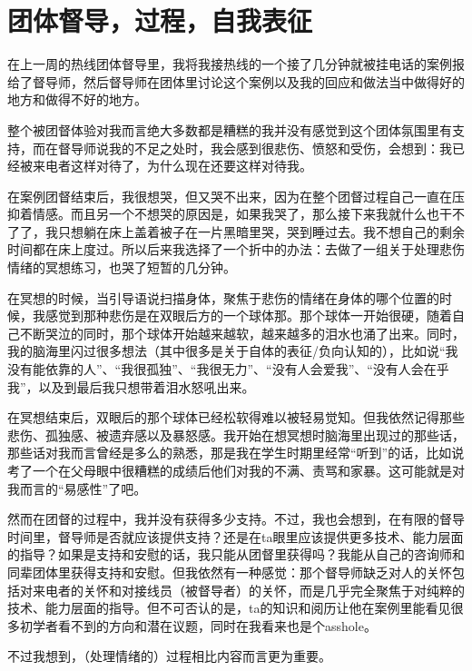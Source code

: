 \chapter{团体督导，过程，自我表征}




在上一周的热线团体督导里，我将我接热线的一个接了几分钟就被挂电话的案例报给了督导师，然后督导师在团体里讨论这个案例以及我的回应和做法当中做得好的地方和做得不好的地方。

整个被团督体验对我而言绝大多数都是糟糕的\pozhehao{}我并没有感觉到这个团体氛围里有支持，而在督导师说我的不足之处时，我会感到很悲伤、愤怒和受伤，会想到：我已经被来电者这样对待了，为什么现在还要这样对待我。

在案例团督结束后，我很想哭，但又哭不出来，因为在整个团督过程自己一直在压抑着情感。而且另一个不想哭的原因是，如果我哭了，那么接下来我就什么也干不了了，我只想躺在床上盖着被子在一片黑暗里哭，哭到睡过去。我不想自己的剩余时间都在床上度过。所以后来我选择了一个折中的办法：去做了一组关于处理悲伤情绪的冥想练习，也哭了短暂的几分钟。

在冥想的时候，当引导语说扫描身体，聚焦于悲伤的情绪在身体的哪个位置的时候，我感觉到那种悲伤是在双眼后方的一个球体那。那个球体一开始很硬，随着自己不断哭泣的同时，那个球体开始越来越软，越来越多的泪水也涌了出来。同时，我的脑海里闪过很多想法（其中很多是关于自体的表征/负向认知的），比如说“我没有能依靠的人”、“我很孤独”、“我很无力”、“没有人会爱我”、“没有人会在乎我”，以及到最后我只想带着泪水怒吼出来。

在冥想结束后，双眼后的那个球体已经松软得难以被轻易觉知。但我依然记得那些悲伤、孤独感、被遗弃感以及暴怒感。我开始在想冥想时脑海里出现过的那些话，那些话对我而言曾经是多么的熟悉，那是我在学生时期里经常“听到”的话，比如说考了一个在父母眼中很糟糕的成绩后他们对我的不满、责骂和家暴。这可能就是对我而言的“易感性”了吧。

然而在团督的过程中，我并没有获得多少支持。不过，我也会想到，在有限的督导时间里，督导师是否就应该提供支持？还是在ta眼里应该提供更多技术、能力层面的指导？如果是支持和安慰的话，我只能从团督里获得吗？我能从自己的咨询师和同辈团体里获得支持和安慰。但我依然有一种感觉：那个督导师缺乏对人的关怀\pozhehao{}包括对来电者的关怀和对接线员（被督导者）的关怀，而是几乎完全聚焦于对纯粹的技术、能力层面的指导。但不可否认的是，ta的知识和阅历让他在案例里能看见很多初学者看不到的方向和潜在议题，同时在我看来也是个asshole。

不过我想到，（处理情绪的）过程相比内容而言更为重要。

